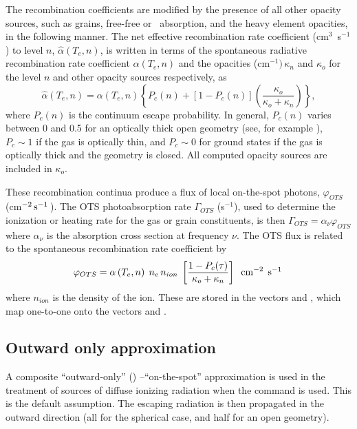 The recombination coefficients are modified by the presence of all other
opacity sources, such as grains, free-free or \hminus\ absorption,
and the heavy element opacities, in the following manner.
The net effective recombination
rate coefficient (cm$^3$~s$^{-1}$) to level $n$,
$\hat{\alpha} ({T_e},n)$,
is written in terms of the spontaneous radiative recombination rate
coefficient $\alpha ({T_e},n)$ and the opacities (cm$^{-1})\,\kappa_n$
and $\kappa_o$ for the level $n$ and other opacity
sources respectively, as
\begin{equation}
\hat \alpha \left( {{T_e},n} \right) = \alpha ({T_e},n)\left\{ {{P_c}(n)
+ \left[ {1 - {P_c}(n)} \right]\left( {\frac{{{\kappa _o}}}{{{\kappa _o}
+ {\kappa _n}}}} \right)} \right\},
\end{equation}
where $P_c(n)$ is the continuum escape probability.
In general, $P_c(n)$ varies
between 0 and 0.5 for an optically thick open geometry
(see, for example
\citealp{Davidson1977}), $P_c \sim 1$ if the gas is optically thin,
and $P_c \sim 0$ for ground
states if the gas is optically thick and the geometry is closed.  All
computed opacity sources are included in $\kappa_o$.

These recombination continua produce a flux of local on-the-spot photons,
$\varphi_{OTS}$ (cm$^{-2} \mbox{${\rm\thinspace s}^{-1}\,$}$).
The OTS photoabsorption rate
$\Gamma_{OTS}$ (s$^{-1}$), used to determine
the ionization or heating rate for the gas or grain constituents,
is then
$\Gamma_{OTS} = \alpha_\nu \varphi_{OTS}$ where $\alpha _\nu$ is the
absorption cross section at frequency $\nu$.
The OTS
flux is related to the spontaneous recombination rate coefficient by
\begin{equation}
{\varphi _{OTS}} = \alpha \left( {{T_e},n}
\right)\;{n_e}\,{n_{ion}}\;\left[ {\frac{{1 - {P_c}(\tau )}}{{{\kappa _o}
+ {\kappa _n}}}} \right]\;\;{{\mathrm{cm}}^{ - 2}}\;\mbox{${\rm\thinspace s}^{-1}\,$}
\end{equation}
where $n_{ion}$ is the density of the ion.
These are stored in the
vectors  and ,
which map one-to-one onto the vectors  and
.

\subsection{Outward only approximation}

A composite ``outward-only'' (\citealp{Tarter1967}) --``on-the-spot''  approximation
is used in the treatment of sources of diffuse ionizing radiation when the
 command is used.
This is the default assumption.
The
escaping radiation is then propagated in the outward direction (all for
the spherical case, and half for an open geometry).

